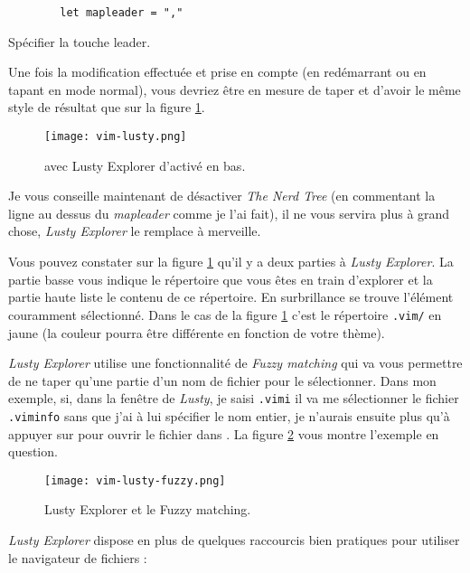 \begin{listing}[H]

    \begin{verbatim}
        let mapleader = ","
    \end{verbatim}
    \caption{Spécifier la touche leader.}
    \label{code:leader}
\end{listing}

Une fois la modification effectuée et prise en compte (en redémarrant \vim ou en tapant  en mode normal), vous devriez être en mesure de taper  et d'avoir le même style de résultat que sur la figure \ref{fig:vim-lusty}.

\begin{figure}%
  \texttt{[image: vim-lusty.png]}
  \caption{\vim avec Lusty Explorer d'activé en bas.}
  \label{fig:vim-lusty}
\end{figure}

Je vous conseille maintenant de désactiver \emph{The Nerd Tree} (en commentant la ligne au dessus du \emph{mapleader} comme je l'ai fait), il ne vous servira plus à grand chose, \emph{Lusty Explorer} le remplace à merveille.

Vous pouvez constater sur la figure \ref{fig:vim-lusty} qu'il y a deux parties à \emph{Lusty Explorer}. La partie basse vous indique le répertoire que vous êtes en train d'explorer et la partie haute liste le contenu de ce répertoire. En surbrillance se trouve l'élément couramment sélectionné. Dans le cas de la figure \ref{fig:vim-lusty} c'est le répertoire \Verb|.vim/| en jaune  (la couleur pourra être différente en fonction de votre thème).

\emph{Lusty Explorer} utilise une fonctionnalité de \emph{Fuzzy matching} qui va vous permettre de ne taper qu'une partie d'un nom de fichier pour le sélectionner. Dans mon exemple, si, dans la fenêtre de \emph{Lusty}, je saisi \Verb|.vimi| il va me sélectionner le fichier \Verb|.viminfo| sans que j'ai à lui spécifier le nom entier, je n'aurais ensuite plus qu'à appuyer sur \ttenter pour ouvrir le fichier dans \vim. La figure \ref{fig:vim-lusty-fuzzy} vous montre l'exemple en question.

\begin{figure}%
  \texttt{[image: vim-lusty-fuzzy.png]}
  \caption{Lusty Explorer et le Fuzzy matching.}
  \label{fig:vim-lusty-fuzzy}
\end{figure}

\emph{Lusty Explorer} dispose en plus de quelques raccourcis bien pratiques pour utiliser le navigateur de fichiers :

